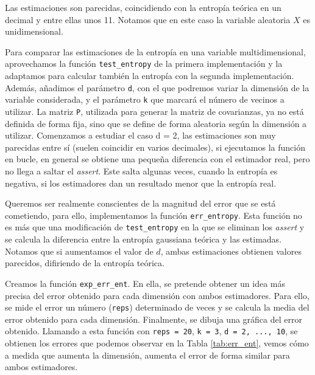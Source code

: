 \documentclass[10pt,a4paper]{article} %
\theoremstyle{definition}
\begin{document}
Las estimaciones son parecidas, coincidiendo con la entropía teórica en un decimal y entre ellas unos 11. Notamos que en este caso la variable aleatoria $X$ es unidimensional.

Para comparar las estimaciones de la entropía en una variable multidimensional, aprovechamos la función \texttt{test\_entropy} de la primera implementación y la adaptamos para calcular también la entropía con la segunda implementación. Además, añadimos el parámetro \texttt{d}, con el que podremos variar la dimensión de la variable considerada, y el parámetro \texttt{k} que marcará el número de vecinos a utilizar. La matriz \texttt{P}, utilizada para generar la matriz de covarianzas, ya no está definida de forma fija, sino que se define de forma aleatoria según la dimensión a utilizar. Comenzamos a estudiar el caso d = 2, las estimaciones son muy parecidas entre sí (suelen coincidir en varios decimales), si ejecutamos la función en bucle, en general se obtiene una pequeña diferencia con el estimador real, pero no llega a saltar el \textit{assert}. Este salta algunas veces, cuando la entropía es negativa, si los estimadores dan un resultado menor que la entropía real.

Queremos ser realmente conscientes de la magnitud del error que se está cometiendo, para ello, implementamos la función \texttt{err\_entropy}. Esta función no es más que una modificación de \texttt{test\_entropy} en la que se eliminan los \textit{assert} y se calcula la diferencia entre la entropía gaussiana teórica y las estimadas. Notamos que si aumentamos el valor de $d$, ambas estimaciones obtienen valores parecidos, difiriendo de la entropía teórica.

Creamos la función \texttt{exp\_err\_ent}. En ella, se pretende obtener un idea más precisa del error obtenido para cada dimensión con ambos estimadores. Para ello, se mide el error un número (\texttt{reps}) determinado de veces y se calcula la media del error obtenido para cada dimensión. Finalmente, se dibuja una gráfica del error obtenido. Llamando a esta función con \texttt{reps = 20}, \texttt{k = 3}, \texttt{d = 2, ..., 10}, se obtienen los errores que podemos observar en la Tabla \ref{tab:err_ent}, vemos cómo a medida que aumenta la dimensión, aumenta el error de forma similar para ambos estimadores.
\end{document}
